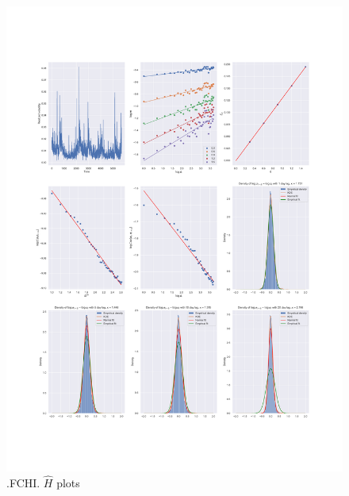 	\begin{figure}[h]
		\centering
		\includegraphics[width=\linewidth]{fig/.FCHI.pdf}
		\caption{.FCHI. $\hat{H}$ plots}
	\end{figure}

